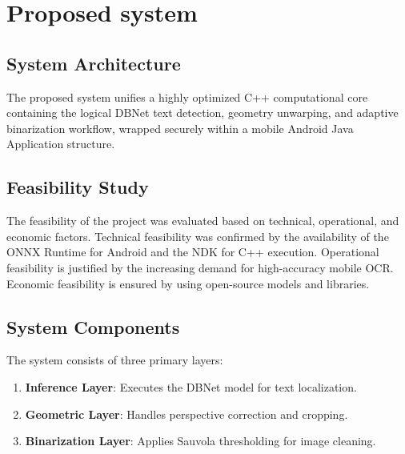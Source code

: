 \chapter{Proposed system}
\section{System Architecture}
The proposed system unifies a highly optimized C++ computational core containing the logical DBNet text detection, geometry unwarping, and adaptive binarization workflow, wrapped securely within a mobile Android Java Application structure.

\section{Feasibility Study}
The feasibility of the project was evaluated based on technical, operational, and economic factors. Technical feasibility was confirmed by the availability of the ONNX Runtime for Android and the NDK for C++ execution. Operational feasibility is justified by the increasing demand for high-accuracy mobile OCR. Economic feasibility is ensured by using open-source models and libraries.

\section{System Components}
The system consists of three primary layers:
\begin{enumerate}
    \item \textbf{Inference Layer}: Executes the DBNet model for text localization.
    \item \textbf{Geometric Layer}: Handles perspective correction and cropping.
    \item \textbf{Binarization Layer}: Applies Sauvola thresholding for image cleaning.
\end{enumerate}
